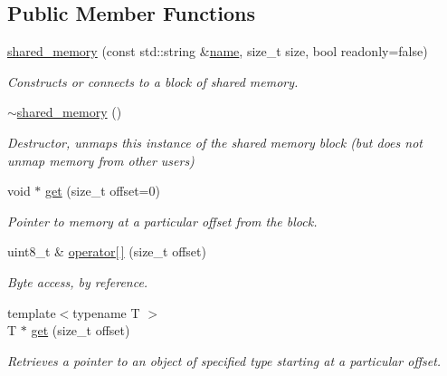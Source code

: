 \subsection*{Public Member Functions}
\begin{DoxyCompactItemize}
\item 
\hyperlink{classcpen333_1_1process_1_1posix_1_1shared__memory_a8a8f0918f8e132e0369c6e9ca9aa6bb6}{shared\+\_\+memory} (const std\+::string \&\hyperlink{classcpen333_1_1process_1_1impl_1_1named__resource__base_a53986a0a1dd26a3602b842c45613b79d}{name}, size\+\_\+t size, bool readonly=false)
\begin{DoxyCompactList}\small\item\em Constructs or connects to a block of shared memory. \end{DoxyCompactList}\item 
\mbox{\label{classcpen333_1_1process_1_1posix_1_1shared__memory_a618389d509320111d7aef051fbd32c07}} 
\hyperlink{classcpen333_1_1process_1_1posix_1_1shared__memory_a618389d509320111d7aef051fbd32c07}{$\sim$shared\+\_\+memory} ()
\begin{DoxyCompactList}\small\item\em Destructor, unmaps this instance of the shared memory block (but does not unmap memory from other users) \end{DoxyCompactList}\item 
void $\ast$ \hyperlink{classcpen333_1_1process_1_1posix_1_1shared__memory_ae97ceec75dc83d43a995daac4769504d}{get} (size\+\_\+t offset=0)
\begin{DoxyCompactList}\small\item\em Pointer to memory at a particular offset from the block. \end{DoxyCompactList}\item 
uint8\+\_\+t \& \hyperlink{classcpen333_1_1process_1_1posix_1_1shared__memory_a832b82cb6ab398e814418b516dba2dd9}{operator\mbox{[}$\,$\mbox{]}} (size\+\_\+t offset)
\begin{DoxyCompactList}\small\item\em Byte access, by reference. \end{DoxyCompactList}\item 
{\footnotesize template$<$typename T $>$ }\\T $\ast$ \hyperlink{classcpen333_1_1process_1_1posix_1_1shared__memory_a09582d7b2863aebbbd74d2f32d0b1af8}{get} (size\+\_\+t offset)
\begin{DoxyCompactList}\small\item\em Retrieves a pointer to an object of specified type starting at a particular offset. \end{DoxyCompactList}\item 

\end{DoxyCompactItemize}
